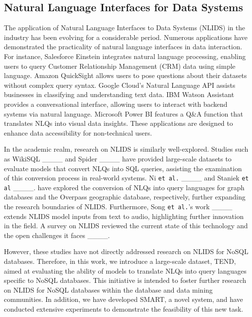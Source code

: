 \subsection{Natural Language Interfaces for Data Systems}
The application of Natural Language Interfaces to Data Systems (NLIDS) in the industry has been evolving for a considerable period. Numerous applications have demonstrated the practicality of natural language interfaces in data interaction. For instance, Salesforce Einstein integrates natural language processing, enabling users to query Customer Relationship Management (CRM) data using simple language. Amazon QuickSight allows users to pose questions about their datasets without complex query syntax. Google Cloud's Natural Language API assists businesses in classifying and understanding text data. IBM Watson Assistant provides a conversational interface, allowing users to interact with backend systems via natural language. Microsoft Power BI features a Q\&A function that translates NLQs into visual data insights. These applications are designed to enhance data accessibility for non-technical users.

In the academic realm, research on NLIDS is similarly well-explored. Studies such as WikiSQL ____ and Spider ____ have provided large-scale datasets to evaluate models that convert NLQs into SQL queries, assisting the examination of this conversion process in real-world systems. Ni \texttt{et al.} ____ and Staniek \texttt{et al} ____. have explored the conversion of NLQs into query languages for graph databases and the Overpass geographic database, respectively, further expanding the research boundaries of NLIDS. Furthermore, Song \texttt{et al.}'s work ____ extends NLIDS model inputs from text to audio, highlighting further innovation in the field. A survey on NLIDS reviewed the current state of this technology and the open challenges it faces ____.

However, these studies have not directly addressed research on NLIDS for NoSQL databases. Therefore, in this work, we introduce a large-scale dataset, TEND, aimed at evaluating the ability of models to translate NLQs into query languages specific to NoSQL databases. This initiative is intended to foster further research on NLIDS for NoSQL databases within the database and data mining communities. In addition, we have developed SMART, a novel system, and have conducted extensive experiments to demonstrate the feasibility of this new task.